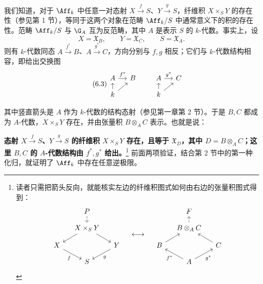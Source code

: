 我们知道，对于 $\Aff_k$ 中任意一对态射 $X\xrightarrow f S$、$Y\xrightarrow g S$，纤维积 $X\times_S Y$ 的存在性（参见第 1 节），等同于这两个对象在范畴 $\Aff_k/S$ 中通常意义下的积的存在性。范畴 $\Aff_k/S$ 与 $\G_A$ 互为反范畴，其中 $A$ 是表示 $S$ 的 $k$-代数。事实上，设
\[
X=\mathfrak X_B,\qquad Y=\mathfrak X_C,\qquad S=\mathfrak X_A.
\]
则有 $k$-代数同态 $A\xrightarrow{f^*}B$、$A\xrightarrow{g^*}C$，方向分别与 $f,g$ 相反；它们与 $k$-代数结构相容，即给出交换图
\begin{equation}\tag{6.3}
\begin{tikzcd}[column sep=small,row sep=small,ampersand replacement=\&]
A\arrow[r,"f^*"]\&B\\
k\arrow[u]\arrow[ur]\&
\end{tikzcd}
\qquad
\begin{tikzcd}[column sep=small,row sep=small,ampersand replacement=\&]
A\arrow[r,"g^*"]\&C\\
k\arrow[u]\arrow[ur]\&
\end{tikzcd}
\end{equation}

其中竖直箭头是 $A$ 作为 $k$-代数的结构态射（参见第一章第 2 节）。于是 $B,C$ 都成为 $A$-代数，$X\times_S Y$ 存在，并由张量积 $B\otimes_A C$ 表示。也就是说：

\textbf{态射 $X\xrightarrow f S$、$Y\xrightarrow g S$ 的纤维积 $X\times_S Y$ 存在，且等于 $\mathfrak X_D$，其中 $D=B\otimes_A C$；这里 $B,C$ 的 $A$-代数结构由 $f^*,g^*$ 给出。}\footnote{读者只需把箭头反向，就能核实左边的纤维积图式如何由右边的张量积图式得到：
\[
\begin{tikzcd}[column sep=small,row sep=small,ampersand replacement=\&]
\&P\arrow[d,dashed]\&\\
\&X\times_S Y\arrow[dl]\arrow[dr]\&\\
X\arrow[dr,"f"']\&\&Y\arrow[dl,"g"]\\
\&S\&
\end{tikzcd}
\quad\longleftrightarrow\quad
\begin{tikzcd}[column sep=small,row sep=small,ampersand replacement=\&]
\&F\&\\
\&B\otimes_A C\arrow[u,dashed]\&\\
B\arrow[ur]\&\&C\arrow[ul]\\
\&A\arrow[ul,"f^*"]\arrow[ur,"g^*"']\&
\end{tikzcd}
\]}
前面两项验证，结合第 2 节中的第一种化归，就证明了 $\Aff_k$ 中存在任意逆极限。

